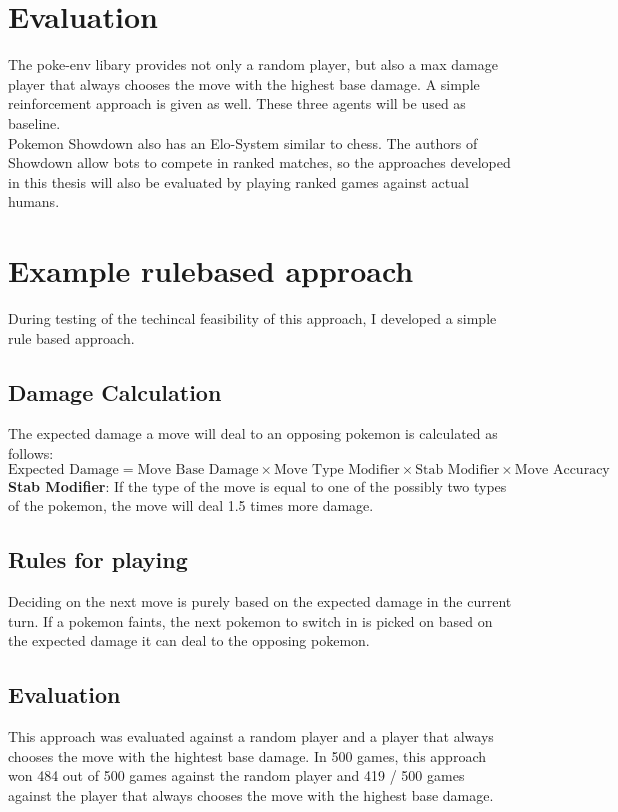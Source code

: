 \documentclass{article}
\begin{document}
\section{Evaluation}
The poke-env libary provides not only a random player, but also a max damage player
that always chooses the move with the highest base damage. A simple reinforcement
approach is given as well. These three agents will be used as baseline. \\
Pokemon Showdown also has an Elo-System similar to chess. The authors of 
Showdown allow bots to compete in ranked matches, so the approaches
developed in this thesis will also be evaluated by playing ranked games 
against actual humans.

\section{Example rulebased approach}
\label{sec:rulebased}
During testing of the techincal feasibility of this approach, I developed a 
simple rule based approach.

\subsection{Damage Calculation}
The expected damage a move will deal to an opposing pokemon is calculated as follows:
\begin{equation*}
    \text{Expected Damage} = \text{Move Base Damage} \times \text{Move Type Modifier} 
        \times \text{Stab Modifier}
        \times \text{Move Accuracy}
\end{equation*}
\textbf{Stab Modifier}: If the type of the move is equal to one of the possibly two types
of the pokemon, the move will deal 1.5 times more damage. 

\subsection{Rules for playing}
Deciding on the next move is purely based on the expected damage in the current turn.
If a pokemon faints, the next pokemon to switch in is picked on based on the expected
damage it can deal to the opposing pokemon.

\subsection{Evaluation}
This approach was evaluated against a random player and a player that always chooses
the move with the hightest base damage. In 500 games, this approach won 484 out of 500
games against the random player and 419 / 500 games against the player that always chooses
the move with the highest base damage.
\end{document}
